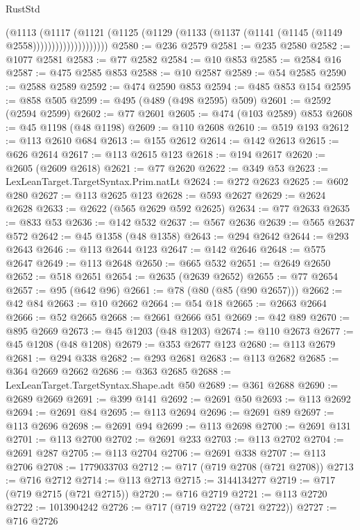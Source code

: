 \begin{lexlean}{RustStd}
\begin{coremodule}
                        (@1113
                          (@1117
                            (@1121
                              (@1125
                                (@1129 (@1133 (@1137 (@1141 (@1145 (@1149 @2558))))))))))))))))))))
@2580 := @236 @2579
@2581 := @235 @2580
@2582 := @1077 @2581
@2583 := @77 @2582
@2584 := @10 @853
@2585 := @2584 @16
@2587 := @475 @2585 @853
@2588 := @10 @2587
@2589 := @54 @2585
@2590 := @2588 @2589
@2592 := @474 @2590 @853
@2594 := @485 @853 @154
@2595 := @858 @505
@2599 := @495 (@489 (@498 @2595) @509)
@2601 := @2592 (@2594 @2599)
@2602 := @77 @2601
@2605 := @474 (@103 @2589) @853
@2608 := @45 @1198 (@48 @1198)
@2609 := @110 @2608
@2610 := @519 @193
@2612 := @113 @2610 @684
@2613 := @155 @2612
@2614 := @142 @2613
@2615 := @626 @2614
@2617 := @113 @2615 @123
@2618 := @194 @2617
@2620 := @2605 (@2609 @2618)
@2621 := @77 @2620
@2622 := @349 @53
@2623 := LexLeanTarget.TargetSyntax.Prim.natLt
@2624 := @272 @2623
@2625 := @602 @280
@2627 := @113 @2625 @123
@2628 := @593 @2627
@2629 := @2624 @2628
@2633 := @2622 (@565 @2629 @592 @2625)
@2634 := @77 @2633
@2635 := @833 @53
@2636 := @142 @532
@2637 := @567 @2636
@2639 := @565 @2637 @572
@2642 := @45 @1358 (@48 @1358)
@2643 := @294 @2642
@2644 := @293 @2643
@2646 := @113 @2644 @123
@2647 := @142 @2646
@2648 := @575 @2647
@2649 := @113 @2648
@2650 := @665 @532
@2651 := @2649 @2650
@2652 := @518 @2651
@2654 := @2635 (@2639 @2652)
@2655 := @77 @2654
@2657 := @95 (@642 @96)
@2661 := @78 (@80 (@85 (@90 @2657)))
@2662 := @42 @84
@2663 := @10 @2662
@2664 := @54 @18
@2665 := @2663 @2664
@2666 := @52 @2665
@2668 := @2661 @2666 @51
@2669 := @42 @89
@2670 := @895 @2669
@2673 := @45 @1203 (@48 @1203)
@2674 := @110 @2673
@2677 := @45 @1208 (@48 @1208)
@2679 := @353 @2677 @123
@2680 := @113 @2679
@2681 := @294 @338
@2682 := @293 @2681
@2683 := @113 @2682
@2685 := @364 @2669 @2662
@2686 := @363 @2685
@2688 := LexLeanTarget.TargetSyntax.Shape.adt @50
@2689 := @361 @2688
@2690 := @2689 @2669
@2691 := @399 @141
@2692 := @2691 @50
@2693 := @113 @2692
@2694 := @2691 @84
@2695 := @113 @2694
@2696 := @2691 @89
@2697 := @113 @2696
@2698 := @2691 @94
@2699 := @113 @2698
@2700 := @2691 @131
@2701 := @113 @2700
@2702 := @2691 @233
@2703 := @113 @2702
@2704 := @2691 @287
@2705 := @113 @2704
@2706 := @2691 @338
@2707 := @113 @2706
@2708 := 1779033703
@2712 := @717 (@719 @2708 (@721 @2708))
@2713 := @716 @2712
@2714 := @113 @2713
@2715 := 3144134277
@2719 := @717 (@719 @2715 (@721 @2715))
@2720 := @716 @2719
@2721 := @113 @2720
@2722 := 1013904242
@2726 := @717 (@719 @2722 (@721 @2722))
@2727 := @716 @2726

\end{coremodule}
\end{lexlean}
